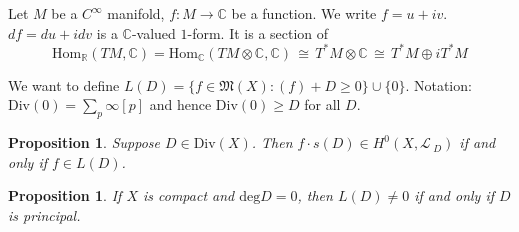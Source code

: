 \documentclass[12pt]{article}
\theoremstyle{plain}
\newtheorem{proposition}[equation]{Proposition}
\theoremstyle{definition}
\newcommand{\fM}{\mathfrak{M}}
\newcommand{\sL}{\mathcal{L}\,}
\newcommand{\IC}{\mathbb{C}}
\newcommand{\IR}{\mathbb{R}}
\newcommand{\Hom}{\mathrm{Hom}}
\renewcommand{\deg}{\mathrm{deg}}
\newcommand\iso{{\, \cong \,}}
\newcommand\tensor{{\otimes}}
\newcommand{\<}{\langle}
\renewcommand{\>}{\rangle}
\newcommand{\Div}{\mathrm{Div}}
\begin{document}
Let $M$ be a $C^\infty$ manifold, $f : M \to \IC$ be a function. We write $f = u + i v$. $df = du + i dv$ is a $\IC$-valued $1$-form. It is a section of
$$ \Hom_\IR (TM, \IC) = \Hom_\IC ( TM \tensor \IC, \IC) \iso T^* M \tensor \IC \iso T^* M \oplus i T^*M $$





We want to define $L(D) = \{ f \in \fM(X): (f) + D \ge 0 \} \cup \{ 0 \}$. Notation: $\Div(0) = \sum_p \infty [p]$ and hence $\Div(0) \ge D$ for all $D$. 

\begin{proposition}
Suppose $D \in \Div(X)$. Then $f \cdot s(D) \in H^0(X, \sL_D)$ if and only if $f \in L(D)$.
\end{proposition}

\begin{proposition}
If $X$ is compact and $\deg D = 0$, then $L(D) \neq 0$ if and only if $D$ is principal. 
\end{proposition}
\end{document}
